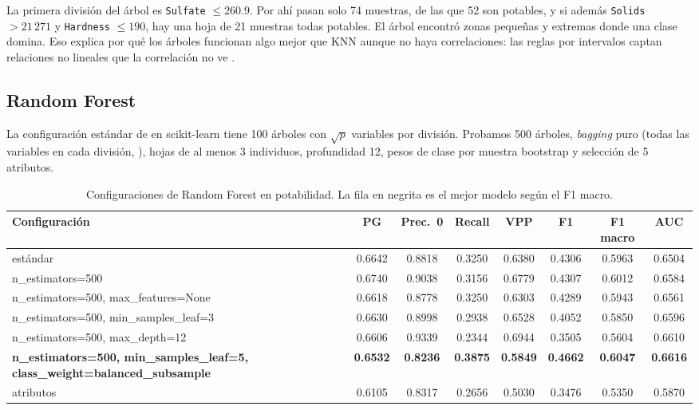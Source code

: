 \documentclass[11pt,a4paper]{article}
\let\citepOriginal\citep
\renewcommand*{\citep}[1]{\textbf{\citepOriginal{#1}}}%
\let\citetOriginal\citet
\renewcommand*{\citet}[1]{\textbf{\citetOriginal{#1}}}%
\let\citealpOriginal\citealp
\renewcommand*{\citealp}[1]{\textbf{\citealpOriginal{#1}}}%
\begin{document}
La primera división del árbol es \texttt{Sulfate} $\le 260.9$. Por ahí pasan solo 74 muestras, de las que 52 son potables, y si además \texttt{Solids} $>21\,271$ y \texttt{Hardness} $\le 190$, hay una hoja de 21 muestras todas potables. El árbol encontró zonas pequeñas y extremas donde una clase domina. Eso explica por qué los árboles funcionan algo mejor que KNN aunque no haya correlaciones: las reglas por intervalos captan relaciones no lineales que la correlación no ve \citep{hastie2009}.

\subsection{Random Forest}
La configuración estándar de \citet{breiman2001} en scikit-learn tiene 100 árboles con $\sqrt{p}$ variables por división. Probamos 500 árboles, \textit{bagging} puro (todas las variables en cada división, \citealp{breiman1996}), hojas de al menos 3 individuos, profundidad 12, pesos de clase por muestra bootstrap y selección de 5 atributos.

\begin{table}[H]
\centering
\small
\caption{Configuraciones de Random Forest en potabilidad. La fila en negrita es el mejor modelo según el F1 macro.}
\setlength{\tabcolsep}{4pt}
\begin{tabular}{>{\raggedright\arraybackslash}p{4.9cm}ccccccc}
\toprule
Configuración & PG & Prec.\ 0 & Recall & VPP & F1 & F1 macro & AUC \\
\midrule
estándar & 0.6642 & 0.8818 & 0.3250 & 0.6380 & 0.4306 & 0.5963 & 0.6504 \\
n\_estimators=\allowbreak{}500 & 0.6740 & 0.9038 & 0.3156 & 0.6779 & 0.4307 & 0.6012 & 0.6584 \\
n\_estimators=\allowbreak{}500, \allowbreak max\_features=\allowbreak{}None & 0.6618 & 0.8778 & 0.3250 & 0.6303 & 0.4289 & 0.5943 & 0.6561 \\
n\_estimators=\allowbreak{}500, \allowbreak min\_samples\_leaf=\allowbreak{}3 & 0.6630 & 0.8998 & 0.2938 & 0.6528 & 0.4052 & 0.5850 & 0.6596 \\
n\_estimators=\allowbreak{}500, \allowbreak max\_depth=\allowbreak{}12 & 0.6606 & 0.9339 & 0.2344 & 0.6944 & 0.3505 & 0.5604 & 0.6610 \\
\textbf{n\_estimators=\allowbreak{}500, \allowbreak min\_samples\_leaf=\allowbreak{}5, \allowbreak class\_weight=\allowbreak{}balanced\_subsample} & \textbf{0.6532} & \textbf{0.8236} & \textbf{0.3875} & \textbf{0.5849} & \textbf{0.4662} & \textbf{0.6047} & \textbf{0.6616} \\
5 atributos & 0.6105 & 0.8317 & 0.2656 & 0.5030 & 0.3476 & 0.5350 & 0.5870 \\
\bottomrule
\end{tabular}
\end{table}
\end{document}
